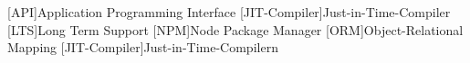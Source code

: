 [API]{Application Programming Interface}
[JIT-Compiler]{Just-in-Time-Compiler}
[LTS]{Long Term Support}
[NPM]{Node Package Manager}
[ORM]{Object-Relational Mapping}
[JIT-Compiler]{Just-in-Time-Compilern}
